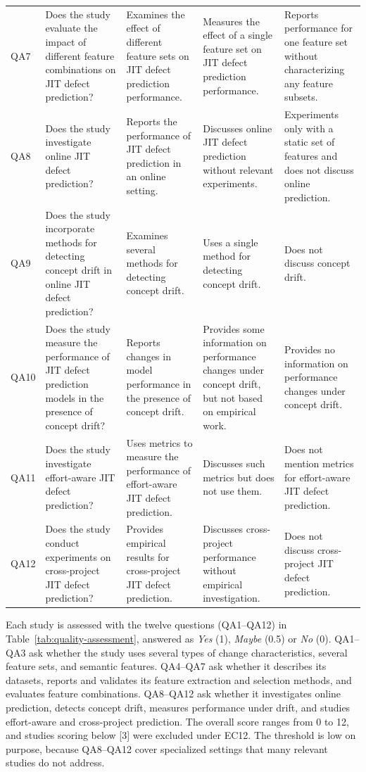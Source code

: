 \documentclass[sigconf,review]{acmart}
\newcommand{\tofill}[1]{{\color{red}[#1]}}
\begin{document}
\begin{table}[t]
\begin{tabular}{@{}p{}p{}p{}p{}p{}@{}}
        QA7 & Does the study evaluate the impact of different feature combinations on JIT defect prediction? & Examines the effect of different feature sets on JIT defect prediction performance. & Measures the effect of a single feature set on JIT defect prediction performance. & Reports performance for one feature set without characterizing any feature subsets. \\
        QA8 & Does the study investigate online JIT defect prediction? & Reports the performance of JIT defect prediction in an online setting. & Discusses online JIT defect prediction without relevant experiments. & Experiments only with a static set of features and does not discuss online prediction. \\
        QA9 & Does the study incorporate methods for detecting concept drift in online JIT defect prediction? & Examines several methods for detecting concept drift. & Uses a single method for detecting concept drift. & Does not discuss concept drift. \\
        QA10 & Does the study measure the performance of JIT defect prediction models in the presence of concept drift? & Reports changes in model performance in the presence of concept drift. & Provides some information on performance changes under concept drift, but not based on empirical work. & Provides no information on performance changes under concept drift. \\
        QA11 & Does the study investigate effort-aware JIT defect prediction? & Uses metrics to measure the performance of effort-aware JIT defect prediction. & Discusses such metrics but does not use them. & Does not mention metrics for effort-aware JIT defect prediction. \\
        QA12 & Does the study conduct experiments on cross-project JIT defect prediction? & Provides empirical results for cross-project JIT defect prediction. & Discusses cross-project performance without empirical investigation. & Does not discuss cross-project JIT defect prediction. \\
        \bottomrule
    \end{tabular}
\end{table}

Each study is assessed with the twelve questions (QA1--QA12) in Table~\ref{tab:quality-assessment}, answered as \textit{Yes} (1), \textit{Maybe} (0.5) or \textit{No} (0). QA1--QA3 ask whether the study uses several types of change characteristics, several feature sets, and semantic features. QA4--QA7 ask whether it describes its datasets, reports and validates its feature extraction and selection methods, and evaluates feature combinations. QA8--QA12 ask whether it investigates online prediction, detects concept drift, measures performance under drift, and studies effort-aware and cross-project prediction. The overall score ranges from 0 to 12, and studies scoring below \tofill{3} were excluded under EC12. The threshold is low on purpose, because QA8--QA12 cover specialized settings that many relevant studies do not address.
\end{document}
